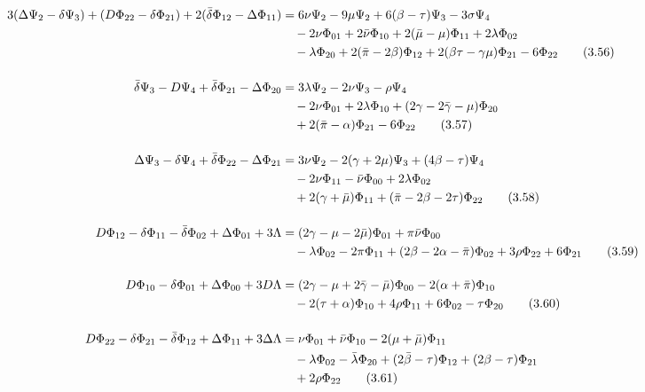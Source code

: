 \begin{align}
3(\Delta \Psi_{2} - \delta \Psi_{3}) + (D \Phi_{22} - \delta \Phi_{21}) + 2 (\bar{\delta} \Phi_{12} - \Delta \Phi_{11}) 
&= 6 \nu \Psi_{2} - 9 \mu \Psi_{2} + 6 (\beta - \tau) \Psi_{3} - 3 \sigma \Psi_{4} \notag \\
& \quad - 2 \nu \Phi_{01} + 2 \bar{\nu} \Phi_{10} + 2 (\bar{\mu} - \mu) \Phi_{11} + 2 \lambda \Phi_{02} \notag \\
& \quad - \lambda \Phi_{20} + 2 (\bar{\pi} - 2 \beta) \Phi_{12} + 2 (\beta \tau - \gamma \mu) \Phi_{21} - 6 \Phi_{22}
\tag{3.56} \\[12pt]
%
\bar{\delta} \Psi_{3} - D \Psi_{4} + \bar{\delta} \Phi_{21} - \Delta \Phi_{20} 
&= 3 \lambda \Psi_{2} - 2 \nu \Psi_{3} - \rho \Psi_{4} \notag \\
& \quad - 2 \nu \Phi_{01} + 2 \lambda \Phi_{10} + (2 \gamma - 2 \bar{\gamma} - \mu) \Phi_{20} \notag \\
& \quad + 2 (\bar{\pi} - \alpha) \Phi_{21} - 6 \Phi_{22}
\tag{3.57} \\[12pt]
%
\Delta \Psi_{3} - \delta \Psi_{4} + \bar{\delta} \Phi_{22} - \Delta \Phi_{21} 
&= 3 \nu \Psi_{2} - 2 (\gamma + 2 \mu) \Psi_{3} + (4 \beta - \tau) \Psi_{4} \notag \\
& \quad - 2 \nu \Phi_{11} - \bar{\nu} \Phi_{00} + 2 \lambda \Phi_{02} \notag \\
& \quad + 2 (\gamma + \bar{\mu}) \Phi_{11} + (\bar{\pi} - 2 \beta - 2 \tau) \Phi_{22}
\tag{3.58} \\[12pt]
%
D \Phi_{12} - \delta \Phi_{11} - \bar{\delta} \Phi_{02} + \Delta \Phi_{01} + 3 \Lambda 
&= (2 \gamma - \mu - 2 \bar{\mu}) \Phi_{01} + \pi \bar{\nu} \Phi_{00} \notag \\
& \quad - \lambda \Phi_{02} - 2 \pi \Phi_{11} + (2 \beta - 2 \alpha - \bar{\pi}) \Phi_{02} + 3 \rho \Phi_{22} + 6 \Phi_{21}
\tag{3.59} \\[12pt]
%
D \Phi_{10} - \delta \Phi_{01} + \Delta \Phi_{00} + 3 D \Lambda 
&= (2 \gamma - \mu + 2 \bar{\gamma} - \bar{\mu}) \Phi_{00} - 2 (\alpha + \bar{\pi}) \Phi_{10} \notag \\
& \quad - 2 (\tau + \alpha) \Phi_{10} + 4 \rho \Phi_{11} + 6 \Phi_{02} - \tau \Phi_{20}
\tag{3.60} \\[12pt]
%
D \Phi_{22} - \delta \Phi_{21} - \bar{\delta} \Phi_{12} + \Delta \Phi_{11} + 3 \Delta \Lambda 
&= \nu \Phi_{01} + \bar{\nu} \Phi_{10} - 2 (\mu + \bar{\mu}) \Phi_{11} \notag \\
& \quad - \lambda \Phi_{02} - \bar{\lambda} \Phi_{20} + (2 \bar{\beta} - \tau) \Phi_{12} + (2 \beta - \tau) \Phi_{21} \notag \\
& \quad + 2 \rho \Phi_{22}
\tag{3.61}
\end{align}

